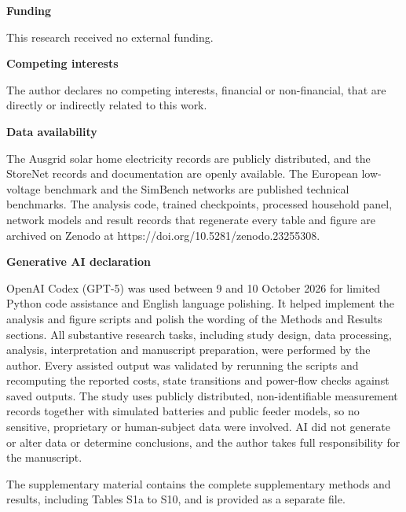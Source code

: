 \documentclass[pdflatex,Numbered,sn-basic]{sn-jnl}
\begin{document}
\par\medskip\noindent\textbf{Funding}\par

This research received no external funding.

\par\medskip\noindent\textbf{Competing interests}\par

The author declares no competing interests, financial or non-financial, that are directly or indirectly related to this work.

\par\medskip\noindent\textbf{Data availability}\par

The Ausgrid solar home electricity records are publicly distributed, and the StoreNet records and documentation are openly available. The European low-voltage benchmark and the SimBench networks are published technical benchmarks. The analysis code, trained checkpoints, processed household panel, network models and result records that regenerate every table and figure are archived on Zenodo at https://doi.org/10.5281/zenodo.23255308.

\par\medskip\noindent\textbf{Generative AI declaration}\par

OpenAI Codex (GPT-5) was used between 9 and 10 October 2026 for limited Python code assistance and English language polishing. It helped implement the analysis and figure scripts and polish the wording of the Methods and Results sections. All substantive research tasks, including study design, data processing, analysis, interpretation and manuscript preparation, were performed by the author. Every assisted output was validated by rerunning the scripts and recomputing the reported costs, state transitions and power-flow checks against saved outputs. The study uses publicly distributed, non-identifiable measurement records together with simulated batteries and public feeder models, so no sensitive, proprietary or human-subject data were involved. AI did not generate or alter data or determine conclusions, and the author takes full responsibility for the manuscript.

\backmatter

The supplementary material contains the complete supplementary methods and results,
including Tables S1a to S10, and is provided as a separate file.
\end{document}
